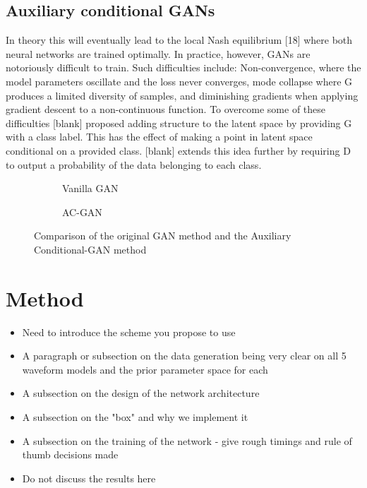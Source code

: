 \documentclass[12pt]{iopart}
\begin{document}
\subsection{Auxiliary conditional GANs}
In theory this will eventually lead to the local Nash equilibrium [18] where
both neural networks are trained optimally. In practice, however, GANs are
notoriously difficult to train. Such difficulties include: Non-convergence,
where the model parameters oscillate and the loss never converges, mode
collapse where G produces a limited diversity of samples, and diminishing
gradients when applying gradient descent to a
non-continuous function. To overcome some of these difficulties [blank]
proposed adding structure to the latent space by providing G with a class
label. This has the effect of making a point in latent space conditional on a
provided class. [blank] extends this idea further by requiring D to output a
probability of the data belonging to each class. 

\begin{figure}
    \centering
    \begin{subfigure}[h]{0.5\textwidth}
        \centering
        \caption{Vanilla GAN}
        \label{fig:GAN}
    \end{subfigure}\hfill
    \begin{subfigure}[h]{0.5\textwidth}
        \centering
        \caption{AC-GAN}
        \label{fig:ACGAN}
    \end{subfigure}\hfill
    \caption{Comparison of the original GAN method and the Auxiliary Conditional-GAN method }
\end{figure}

\section{Method}

\begin{itemize}
\item Need to introduce the scheme you propose to use
\item A paragraph or subsection on the data generation being very clear on all
5 waveform models and the prior parameter space for each 
\item A subsection on the design of the network architecture
\item A subsection on the "box" and why we implement it
\item A subsection on the training of the network - give rough timings and rule
of thumb decisions made
\item Do not discuss the results here 
\end{itemize}
\end{document}
